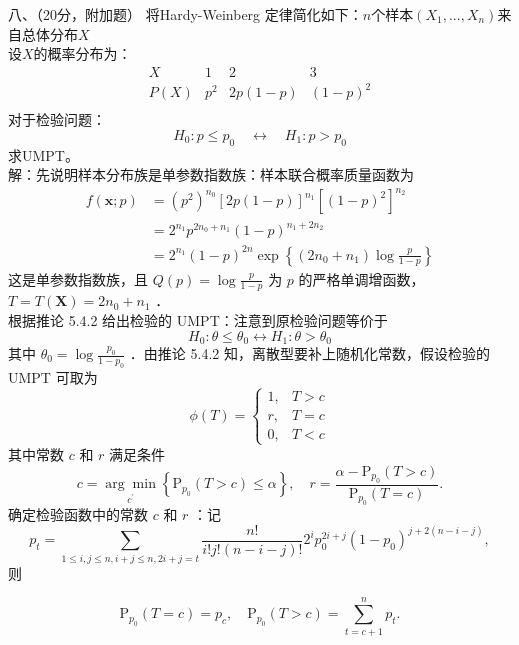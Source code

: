\documentclass[UTF8,openany]{book}
\begin{document}
	
	\noindent 八、（20分，附加题）
	将Hardy-Weinberg 定律简化如下：$n$个样本$(X_1,...,X_n)$来自总体分布$X$\\
	设$X$的概率分布为：
	\[
	\begin{array}{c|ccc}
		X & 1 & 2 & 3 \\ \hline
		P(X) & p^2 & 2p(1-p) & (1-p)^2 \\
	\end{array}
	\]
	对于检验问题：
	\[
	H_0: p \leq p_0 \quad \leftrightarrow \quad H_1: p > p_0
	\]
	求UMPT。\\
	解：先说明样本分布族是单参数指数族：样本联合概率质量函数为
	$$
	\begin{aligned}
		f(\boldsymbol{x} ; p) & =\left(p^2\right)^{n_0}[2 p(1-p)]^{n_1}\left[(1-p)^2\right]^{n_2} \\
		& =2^{n_1} p^{2 n_0+n_1}(1-p)^{n_1+2 n_2}\\
		&=2^{n_1}(1-p)^{2 n} \exp \left\{\left(2 n_0+n_1\right) \log \frac{p}{1-p}\right\}
	\end{aligned}
	$$
	这是单参数指数族，且 $Q(p)=\log \frac{p}{1-p}$ 为 $p$ 的严格单调增函数，$T=T(\boldsymbol{X})=2 n_0+n_1$ ．\\
	根据推论 5.4.2 给出检验的 UMPT：注意到原检验问题等价于
	$$
	H_0: \theta \leq \theta_0 \longleftrightarrow H_1: \theta>\theta_0
	$$
	其中 $\theta_0=\log \frac{p_0}{1-p_0}$ ．由推论 5.4.2 知，离散型要补上随机化常数，假设检验的 UMPT 可取为
	$$
	\phi(T)= \begin{cases}1, & T>c \\ r, & T=c \\ 0, & T<c\end{cases}
	$$
	其中常数 $c$ 和 $r$ 满足条件
	$$
	c=\underset{c^{\prime}}{\arg \min }\left\{\mathrm{P}_{p_0}(T>c) \leq \alpha\right\}, \quad r=\frac{\alpha-\mathrm{P}_{p_0}(T>c)}{\mathrm{P}_{p_0}(T=c)} .
	$$
	确定检验函数中的常数 $c$ 和 $r$ ：记
	$$
	p_t=\sum_{1 \leq i, j \leq n, i+j \leq n, 2 i+j=t} \frac{n!}{i!j!(n-i-j)!} 2^i p_0^{2 i+j}\left(1-p_0\right)^{j+2(n-i-j)},
	$$
	则
	
	$$
	\mathrm{P}_{p_0}(T=c)=p_c, \quad \mathrm{P}_{p_0}(T>c)=\sum_{t=c+1}^n p_t .
	$$
	\newpage
\end{document}
